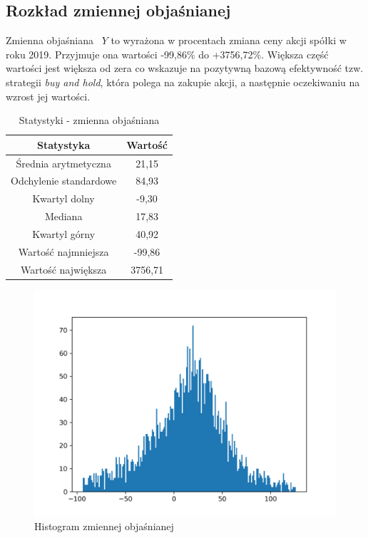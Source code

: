 \documentclass{article}
\begin{document}
\newpage
\subsection{Rozkład zmiennej objaśnianej}
Zmienna objaśniana ~$Y$ to wyrażona w procentach zmiana ceny akcji spółki w roku 2019. Przyjmuje ona wartości -99,86\% do +3756,72\%. Większa część wartości jest większa od zera co wskazuje na pozytywną bazową efektywność tzw. strategii \textit{buy and hold}, która polega na zakupie akcji, a następnie oczekiwaniu na wzrost jej wartości.

\begin{table}[h!]
    \begin{center}
    \begin{tabular}{|c | c|} 
    \hline
    Statystyka & Wartość \\
    \hline\hline
    Średnia arytmetyczna & 21,15 \\ 
    \hline
    Odchylenie standardowe & 84,93 \\
    \hline
    Kwartyl dolny & -9,30 \\
    \hline
    Mediana & 17,83 \\
    \hline
    Kwartyl górny & 40,92 \\
    \hline
    Wartość najmniejsza & -99,86 \\
    \hline
    Wartość największa & 3756,71 \\
    \hline
   \end{tabular}
    \end{center}
   \caption{Statystyki - zmienna objaśniana}
\end{table}

\begin{figure}[h!]
    \includegraphics[width=\linewidth]{source/YHistogram.png}
    \caption{Histogram zmiennej objaśnianej}
\end{figure}
\end{document}
